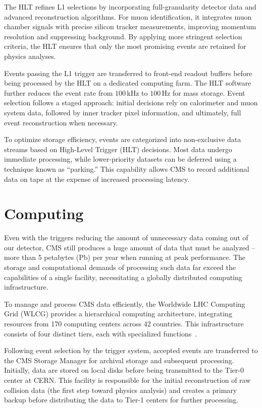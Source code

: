 The HLT refines L1 selections by incorporating full-granularity detector data and advanced reconstruction algorithms. For muon identification, it integrates muon chamber signals with precise silicon tracker measurements, improving momentum resolution and suppressing background. By applying more stringent selection criteria, the HLT ensures that only the most promising events are retained for physics analyses.

Events passing the L1 trigger are transferred to front-end readout buffers before being processed by the HLT on a dedicated computing farm. The HLT software further reduces the event rate from $100\,\mathrm{kHz}$ to $100\,\mathrm{Hz}$ for mass storage. Event selection follows a staged approach: initial decisions rely on calorimeter and muon system data, followed by inner tracker pixel information, and ultimately, full event reconstruction when necessary.

To optimize storage efficiency, events are categorized into non-exclusive data streams based on High-Level Trigger (HLT) decisions. Most data undergo immediate processing, while lower-priority datasets can be deferred using a technique known as ``parking.'' This capability allows CMS to record additional data on tape at the expense of increased processing latency.

\section{Computing}

Even with the triggers reducing the amount of unnecessary data coming out of our detector, CMS still produces a huge amount of data that must be analyzed -- more than 5 petabytes (Pb) per year when running at peak performance. The storage and computational demands of processing such data far exceed the capabilities of a single facility, necessitating a globally distributed computing infrastructure.

To manage and process CMS data efficiently, the Worldwide LHC Computing Grid (WLCG) provides a hierarchical computing architecture, integrating resources from 170 computing centers across 42 countries. This infrastructure consists of four distinct tiers, each with specialized functions~\cite{Cittolin:578006, SHIERS2007219, Bayatyan:838359}.

Following event selection by the trigger system, accepted events are transferred to the CMS Storage Manager for archival storage and subsequent processing. Initially, data are stored on local disks before being transmitted to the Tier-0 center at CERN. This facility is responsible for the initial reconstruction of raw collision data (the first step toward physics analysis) and creates a primary backup before distributing the data to Tier-1 centers for further processing.


